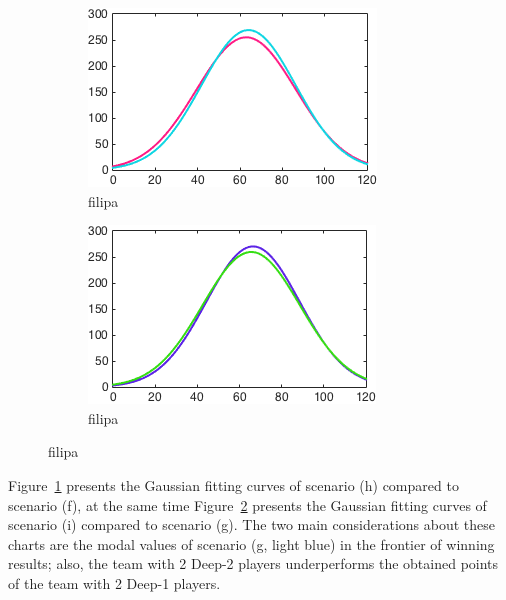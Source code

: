 \begin{figure}[h]
        \centering
        \begin{subfigure}[h]{0.4\textwidth}
                \includegraphics[width=\textwidth]{./img/5/FH}
                \caption{filipa}
                \label{fig:FH}
        \end{subfigure}
        \begin{subfigure}[h]{0.4\textwidth}
                \includegraphics[width=\textwidth]{./img/5/GI}
                \caption{filipa}
                \label{fig:GI}
        \end{subfigure}
        \caption{filipa}
        \label{fig:FGHI}
\end{figure}

Figure~\ref{fig:FH} presents the Gaussian fitting curves of scenario (h) compared to scenario (f), at the same time Figure~\ref{fig:GI} presents the Gaussian fitting curves of scenario (i) compared to scenario (g).
The two main considerations about these charts are the modal values of scenario (g, light blue) in the frontier of winning results; also, the team with 2 Deep-2 players underperforms the obtained points of the team with 2 Deep-1 players.

